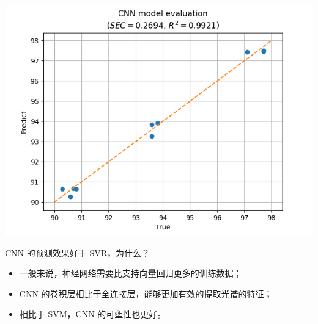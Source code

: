 \documentclass[11pt]{beamer}
\begin{document}
	\begin{frame}
		\centering
		\includegraphics[width=\linewidth]{../img/cnn_result}
	\end{frame}
	\begin{frame}
		\begin{block}{CNN 的预测效果好于 SVR，为什么？}
			\bigskip
			\begin{itemize}
				\item 一般来说，神经网络需要比支持向量回归更多的训练数据；
				\item CNN 的卷积层相比于全连接层，能够更加有效的提取光谱的特征；
				\item 相比于 SVM，CNN 的可塑性也更好。
			\end{itemize}
		\end{block}
	\end{frame}
\end{document}
